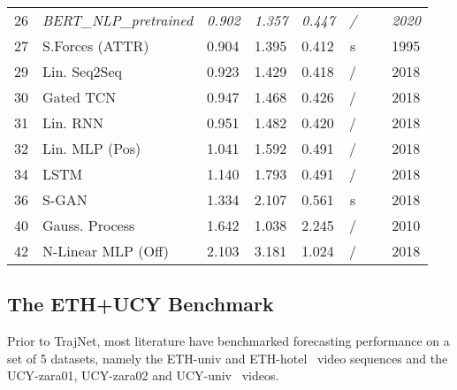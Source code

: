 \documentclass[a4paper,conference]{IEEEtran}
\newcommand{\blu}[1]{{\emph{\color{blue} {#1}}}}
\begin{document}
\begin{table}[t]
\begin{center}
{\begin{tabular}{cllllccl}
26 & \blu{BERT\_NLP\_pretrained} &	\blu{0.902} & \blu{1.357} & \blu{0.447}&\blu{/}&&  \blu{2020} \\
    27  & S.Forces (ATTR)  & 0.904  & 1.395 & 0.412& s &\cite{helbing1995social}& 1995 \\
29  & Lin. Seq2Seq & 0.923 & 1.429 & 0.418& /&\cite{becker2018evaluation}&  2018 \\
30  & Gated TCN & 0.947 & 1.468 & 0.426& /&\cite{bai2018empirical}&  2018 \\
31  & Lin. RNN & 0.951 & 1.482 & 0.420& /&\cite{becker2018evaluation}&  2018 \\
32  & Lin. MLP (Pos) & 1.041 & 1.592 & 0.491& /&\cite{becker2018evaluation}&  2018 \\
34 & LSTM &	1.140 & 1.793 & 0.491& /&\cite{LSTM_MATLAB} & 2018 \\
36  & S-GAN & 1.334  & 2.107 & 0.561& s &~\cite{gupta2018social}& 2018   \\
40  & Gauss. Process  & 1.642           & 1.038 & 2.245& /&\cite{trautman2010iros}&  2010 \\
42  & N-Linear MLP (Off) & 2.103 & 3.181 & 1.024& /&~\cite{becker2018evaluation}&  2018  \\
\bottomrule
\end{tabular}
}
\end{center}
\vspace{-0.5cm}

\end{table}



\subsection{The ETH+UCY Benchmark}\label{sec:ethucy}

Prior to TrajNet, most literature have benchmarked forecasting performance on a set of 5 datasets, namely the ETH-univ and ETH-hotel~\cite{pellegrini2009iccv} video sequences and the UCY-zara01, UCY-zara02 and UCY-univ~\cite{lerner2007crowds} videos.
\end{document}

